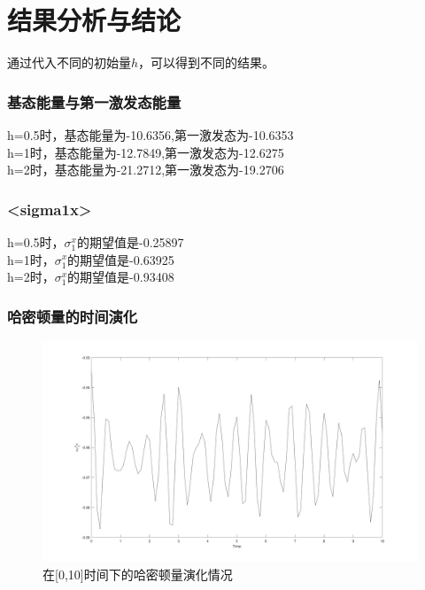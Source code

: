 \documentclass[UTF8,a4paper,10pt]{ctexart}
\begin{document}
\section{结果分析与结论}
通过代入不同的初始量$h$，可以得到不同的结果。

\subsubsection{基态能量与第一激发态能量}
h=0.5时，基态能量为-10.6356,第一激发态为-10.6353\\
h=1时，基态能量为-12.7849,第一激发态为-12.6275\\
h=2时，基态能量为-21.2712,第一激发态为-19.2706\\
\quad \newline

\subsubsection{<sigma1x>}

h=0.5时，$\sigma_{1}^x$的期望值是-0.25897\\
h=1时，$\sigma_{1}^x$的期望值是-0.63925\\
h=2时，$\sigma_{1}^x$的期望值是-0.93408\\
\quad \newline

\subsubsection{哈密顿量的时间演化}

\begin{figure}[!htbp]
    \centering
    \includegraphics[width=1\textwidth,height=1\textwidth]{pictures/valuet.png}
    \caption{在[0,10]时间下的哈密顿量演化情况} \label{ek2}
\end{figure}
\end{document}
